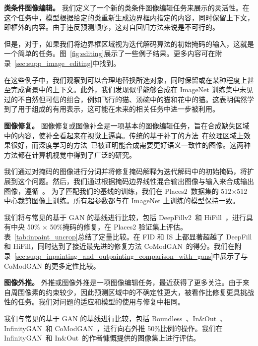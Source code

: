 \noindent\textbf{类条件图像编辑。}
我们定义了一个新的类条件图像编辑任务来展示\model 的灵活性。在这个任务中，模型根据给定的类重新生成边界框内指定的内容，同时保留上下文，即框外的内容。由于违反预测顺序，这对自回归方法来说是不可行的。

但是，对于\model ，如果我们将边界框区域视为迭代解码算法的初始掩码的输入，这就是一个简单的任务。图~\ref{fig:editing}展示了一些例子结果。更多内容可在附录~\ref{sec:supp_image_editing}中找到。

在这些例子中，我们观察到\model 可以合理地替换所选对象，同时保留或在某种程度上甚至完成背景中的上下文。此外，我们发现\model 似乎能够合成在 ImageNet 训练集中未见过的不自然但可信的组合，例如飞行的猫、汤碗中的猫和花中的猫。这表明\model 偶然学到了用于组成的有用表示，这可能在未来的相关任务中进一步被利用。

\vspace{2mm}
\noindent\textbf{图像修复。}
\label{ssec:inpainting}
图像修复或图像补全是一项基本的图像编辑任务，旨在合成缺失区域中的内容，使补全看起来在视觉上逼真。传统的基于补丁的方法~\cite{Barnes:2009:patchmatch}在纹理区域上效果很好，而深度学习的方法~\cite{yu2019free, yi2020contextual, zhao2021comodgan, saharia2021palette, esser2021imagebart}已被证明能合成需要更好语义一致性的图像。这两种方法都在计算机视觉中得到了广泛的研究。

我们通过对掩码的图像进行分词并将修复掩码解释为迭代解码中的初始掩码，将\model 扩展到这个问题。然后，我们通过根据掩码边界线性混合输出图像与输入来合成输出图像，遵循~\cite{cheng2021inout}。
为了匹配我们的基线的训练，我们在 Places2~\cite{zhou2017places}数据集的 512$\times$512 中心裁剪图像上训练\model 。所有超参数都与在 ImageNet 上训练的\model 模型保持一致。

我们将\model 与常见的基于 GAN 的基线进行比较，包括 DeepFillv2~\cite{yu2019free}和 HiFill~\cite{yi2020contextual}，进行具有中央 50\% $\times$ 50\%掩码的修复，在 Places2 验证集上评估。表~\ref{tab:inpaint_uncrop}总结了定量比较。\model 在 FID 和 IS 上都显著超越了 DeepFill 和 HiFill，同时达到了接近最先进的修复方法 CoModGAN~\cite{zhao2021comodgan}的得分。我们在附录~\ref{sec:supp_inpainting_and_outpainting_comparison_with_gans}中展示了与 CoModGAN 的更多定性比较。


\vspace{2mm}
\noindent\textbf{图像外推。}
\label{ssec:outpainting}
外推或图像外推是一项图像编辑任务，最近获得了更多关注。由于来自周围像素的约束较少，因此预测区域中的不确定性更大，被看作比修复更具挑战性的任务。我们对问题的适应和模型的使用与修复中相同。

我们与常见的基于 GAN 的基线进行比较，包括 Boundless~\cite{teterwak2019boundless}、In\&Out~\cite{cheng2021inout}、InfinityGAN~\cite{lin2021infinitygan}和 CoModGAN~\cite{zhao2021comodgan}，进行向右外推 50\%比例的操作。我们在 InfinityGAN~\cite{lin2021infinitygan}和 In\&Out~\cite{cheng2021inout}的作者慷慨提供的图像集上进行评估。

